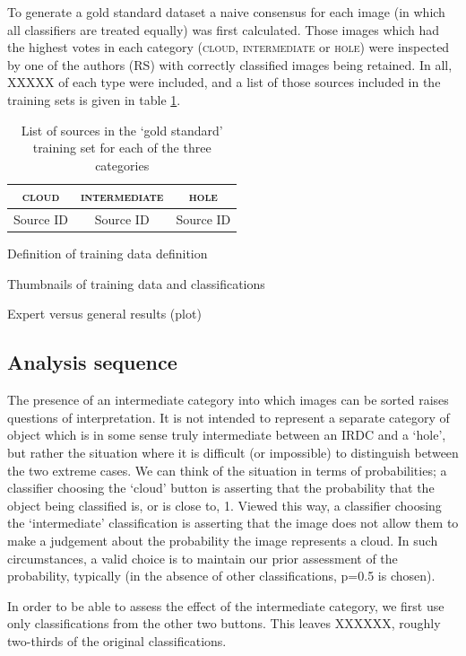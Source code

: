 \documentclass[a4,useAMS,usenatbib]{mn2e}
\begin{document}
To generate a gold standard dataset a naive consensus for each image (in which all classifiers are treated equally) was first calculated. Those images which had the highest votes in each category (\textsc{cloud}, \textsc{intermediate} or \textsc{hole}) were inspected by one of the authors (RS) with correctly classified images being retained. In all, XXXXX of each type were included, and a list of those sources included in the training sets is given in table \ref{tab:gold}. 

\begin{table}
\begin{tabular}{|c|c|c|}
\hline
\textsc{cloud} & \textsc{intermediate} & \textsc{hole}\\
\hline
Source ID & Source ID & Source ID\\
\hline
\end{tabular}
\caption{List of sources in the `gold standard' training set for each of the three categories}\label{tab:gold}
\end{table}

Definition of training data definition

Thumbnails of training data and classifications

Expert versus general results (plot)

\subsection{Analysis sequence}

The presence of an intermediate category into which images can be sorted raises questions of interpretation. It is not intended to represent a separate category of object which is in some sense truly intermediate between an IRDC and a `hole', but rather the situation where it is difficult (or impossible) to distinguish between the two extreme cases. We can think of the situation in terms of probabilities; a classifier choosing the `cloud' button is asserting that the probability that the object being classified is, or is close to, 1. Viewed this way, a classifier choosing the `intermediate' classification is asserting that the image does not allow them to make a judgement about the probability the image represents a cloud. In such circumstances, a valid choice is to maintain our prior assessment of the probability, typically (in the absence of other classifications, p=0.5 is chosen). 

In order to be able to assess the effect of the intermediate category, we first use only classifications from the other two buttons. This leaves XXXXXX, roughly two-thirds of the original classifications. 
\end{document}
